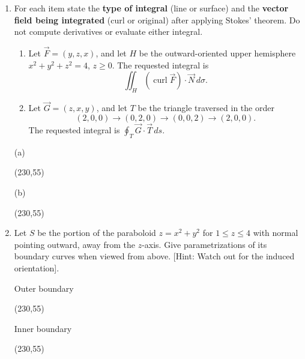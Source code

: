\documentclass[12pt]{exam}
\begin{document}
\begin{enumerate}

\item For each item state the \textbf{type of
integral} (line or surface) and the \textbf{vector field being integrated} (curl or original) after applying Stokes' theorem.
Do not compute derivatives or evaluate either integral.

\begin{enumerate}[label=(\alph*),itemsep=6pt]
\item Let $\vec F=(y,z,x)$, and let $H$ be the outward-oriented upper
hemisphere $x^2+y^2+z^2=4$, $z\geq0$. The requested integral is
\[
\iint_H(\operatorname{curl}\vec F)\cdot\vec N\,d\sigma.
\]
\item Let $\vec G=(z,x,y)$, and let $T$ be the triangle traversed in the order
\[
(2,0,0)\longrightarrow(0,2,0)\longrightarrow(0,0,2)
\longrightarrow(2,0,0).
\]
The requested integral is $\displaystyle\oint_T\vec G\cdot\vec T\,ds$.
\end{enumerate}

\begin{flushright}
\begin{minipage}{0.47\linewidth}
\centering
(a)\par\smallskip
\framebox(230,55){}
\end{minipage}\hspace{0.3cm}
\begin{minipage}{0.47\linewidth}
\centering
(b)\par\smallskip
\framebox(230,55){}
\end{minipage}
\end{flushright}

\item Let $S$ be the portion of the paraboloid \(z=x^2+y^2\) for \(1\leq z\leq 4\)
with normal pointing outward, away from the $z$-axis. Give parametrizations of its boundary curves when viewed from above. [Hint: Watch out for the induced orientation].

\vfill
\begin{flushright}
\begin{minipage}{0.47\linewidth}
\centering
Outer boundary\par\smallskip
\framebox(230,55){}
\end{minipage}\hspace{0.3cm}
\begin{minipage}{0.47\linewidth}
\centering
Inner boundary\par\smallskip
\framebox(230,55){}
\end{minipage}
\end{flushright}


\end{enumerate}
\end{document}
